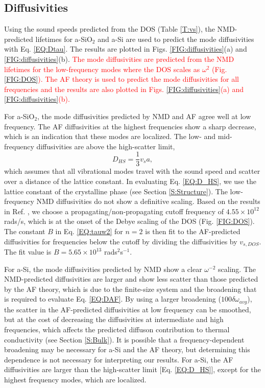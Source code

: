 \documentclass[aps,prb,twocolumn,superscriptaddress,footinbib,amsmath,amssymb,floatfix]{revtex4}
\begin{document}
\subsection{\label{S:Diffusivities}Diffusivities}

Using the sound speeds predicted 
from the DOS (Table \ref{T:vs}), the NMD-predicted lifetimes 
for a-SiO$_2$ and a-Si are used to predict the mode diffusivities with 
Eq. \eqref{EQ:Dtau}. The results are plotted in 
Figs. \ref{FIG:diffusivities}(a) and \ref{FIG:diffusivities}(b).  
\textcolor{red}{
The mode diffusivities are predicted from the NMD lifetimes for the 
low-frequency modes where the DOS scales as $\omega^2$ 
(Fig. \ref{FIG:DOS}). The AF theory is used to predict the mode 
diffusivities for all frequencies and the results are also plotted in 
Figs. \ref{FIG:diffusivities}(a) and \ref{FIG:diffusivities}(b). 
}

For a-SiO$_2$, the mode diffusivities predicted by NMD and AF agree 
well at low frequency. The AF diffusivities at 
the highest frequencies show a sharp decrease, which is an indication 
that these modes are localized.\cite{feldman_thermal_1993} 
The low- and mid-frequency diffusivities are above the 
high-scatter limit, 
\begin{equation}\label{EQ:D_HS}
D_{HS} = \frac{1}{3} v_s a,
\end{equation}
which assumes that all vibrational modes travel with the sound speed  
and scatter over a distance of the lattice constant.
\cite{cahill_lattice_1988} In evaluating Eq. \eqref{EQ:D_HS}, 
we use the lattice constant of the 
crystalline phase (see Section \ref{S:Structure}). The low-frequency 
NMD diffusivities do not show a 
definitive scaling. Based on the results in 
Ref. , we choose a 
propagating/non-propagating cutoff frequency of 
$4.55\times10^{12}$ rads/s, which is at the onset 
of the Debye scaling of the DOS (Fig. \ref{FIG:DOS}). 
The constant $B$ in Eq. \eqref{EQ:tauw2} for $n=2$ 
is then fit to the AF-predicted diffusivities for 
frequencies below the cutoff by dividing the diffusivities 
by $v_{s,DOS}$. The fit value is $B=5.65\times10^{13}$ 
rads$^2$s$^{-1}$.

For a-Si, the mode diffusivities predicted by NMD 
show a clear $\omega^{-2}$ scaling. 
The NMD-predicted diffusivities are larger and show less 
scatter than those predicted by the AF theory, which is due to 
the finite-size system and the broadening that is 
required to evaluate 
Eq. \eqref{EQ:DAF}.\cite{feldman_thermal_1993} By using a larger 
broadening ($100\delta\omega_{avg}$), the scatter 
in the AF-predicted 
diffusivities at low frequency can be smoothed, but at the cost of 
decreasing the diffusivities at intermediate and 
high frequencies, which 
affects the predicted diffuson contribution to thermal 
conductivity (see Section \ref{S:Bulk}). 
It is possible that a frequency-dependent broadening may be 
necessary for a-Si and the AF theory,  
but determining this dependence is not necessary for 
interpreting our results. 
For a-Si, the AF diffusivities are 
larger than the high-scatter limit [Eq. \eqref{EQ:D_HS}], 
except for the highest frequency modes, which are localized.
\cite{feldman_thermal_1993} 
\end{document}
